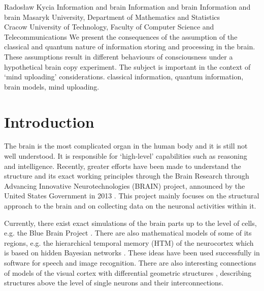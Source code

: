 \begin{artengenv}{Radosław Kycia}
	{Information and brain}
	{Information and brain}
	{Information and brain}
	{Masaryk University, Department of Mathematics and Statistics\\
	Cracow University of Technology, Faculty of Computer Science and Telecommunications\label{kycia_anfang}}
	{We present the consequences of the assumption of the classical and quantum nature of information storing and processing in the brain. These assumptions result in different behaviours of consciousness under a hypothetical brain copy experiment. The subject is important in the context of `mind uploading' considerations.}
	{classical information, quantum information, brain models, mind uploading.}
	
	


\section{Introduction}
\lettrine[loversize=0.13,lines=2,lraise=-0.03,nindent=0em,findent=0.2pt]%
{T}{}he brain is the most complicated organ in the human body and it is still not well understood. It is responsible for `high-level' capabilities such as reasoning and intelligence. Recently, greater efforts have been made to understand the structure and its exact working principles through the Brain Research through Advancing Innovative Neurotechnologies (BRAIN) project, announced by the United States Government in 2013 \parencite{BRAINInitiative}. This project mainly focuses on the structural approach to the brain and on collecting data on the neuronal activities within it.

Currently, there exist exact simulations of the brain parts up to the level of cells, e.g. the Blue Brain Project \parencite{BlueBrainProject}. There are also mathematical models of some of its regions, e.g. the hierarchical temporal memory (HTM) of the neurocortex \parencite{CortexModel1, CortexModel2} which is based on hidden Bayesian networks \parencite{KurzweilHowToCreateBrain}. These ideas have been used successfully in software for speech and image recognition. There are also interesting connections of models of the visual cortex with differential geometric structures \parencite{VisualCortex}, describing structures above the level of single neurons and their interconnections.


\end{artengenv}
